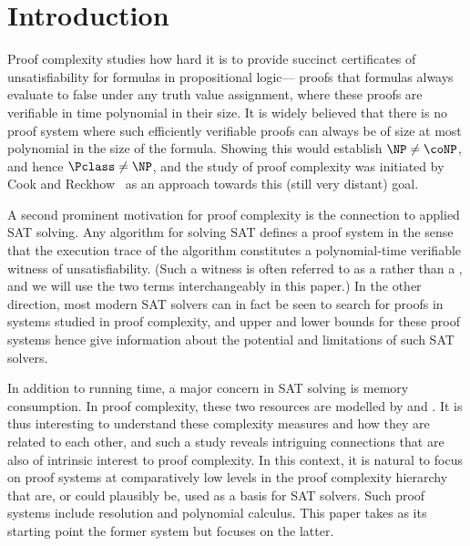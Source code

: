 
%
%
%

%
\section{Introduction}
\label{sec:introduction}

Proof complexity studies how hard it is to provide succinct
certificates of unsatisfiability for formulas in propositional logic---\ieComma
proofs that formulas always evaluate to false under any truth value
assignment, where these proofs are verifiable in time polynomial in
their size.
%
It is widely believed that there is no proof system where such
efficiently verifiable proofs can always be  of size at most
polynomial in the size of the formula.
%
Showing this would establish $\NP \neq \coNP$, and hence
$\Pclass \neq \NP$, and the study of proof complexity was initiated by
Cook and Reckhow~\cite{CR79Relative} as an approach towards this
(still very distant) goal.

A second prominent motivation for proof complexity is the connection
to applied SAT solving. 
%
Any algorithm for solving SAT defines a proof system in the
sense that the execution trace of the algorithm constitutes a
polynomial-time verifiable witness of unsatisfiability. %
(Such a witness
is often referred to as a  rather than a
, and we will use the two terms interchangeably in
this paper.) %
In the other direction, most modern SAT solvers can in
fact be seen to search for proofs in systems studied in proof
complexity, and upper and lower bounds for these proof systems hence
give information about the potential and limitations of 
such SAT solvers.

In addition to running time, a major concern in SAT solving is memory
consumption. 
In proof complexity, these two resources are modelled by
and
.
%
It is thus interesting to understand these
complexity measures and how they are related to each other, and such a
study reveals intriguing connections that are also of intrinsic
interest to proof complexity. In this context, it is natural to focus
on proof systems at comparatively low levels in the proof complexity
hierarchy that are, or could plausibly be, used as a basis for SAT
solvers. Such proof systems include resolution and polynomial
calculus. This paper takes as its starting point the former system but
focuses on the latter.


